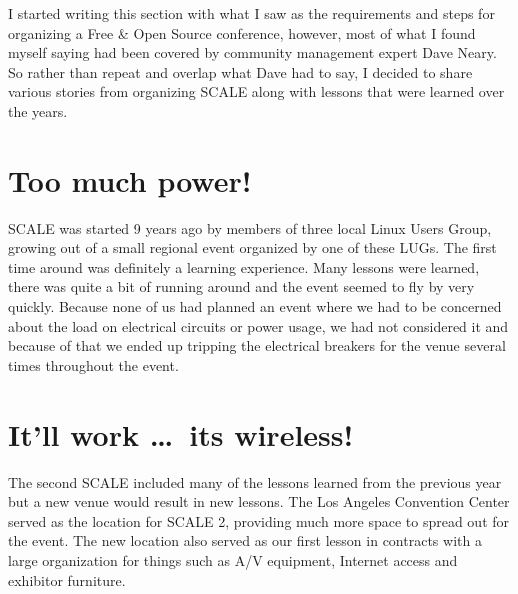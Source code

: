 

\noindent{}I started writing this section with what I saw as the requirements and steps for
organizing a Free \& Open Source conference, however, most of what I found myself saying had been covered by community management expert Dave Neary. So rather than repeat and overlap what Dave had to say, I decided to share various stories from organizing SCALE along with lessons that were learned over the years.

\section*{Too much power!}

SCALE was started 9 years ago by members of three local Linux Users Group,
growing out of a small regional event organized by one of these LUGs. The first
time around was definitely a learning experience. Many lessons were learned,
there was quite a bit of running around and the event seemed to fly by very
quickly. Because none of us had planned an event where we had to be
concerned about the load on electrical circuits or power usage, we had not
considered it and because of that we ended up tripping the electrical breakers
for the venue several times throughout the event.

\section*{It’ll work \dots\ its wireless!}

The second SCALE included many of the lessons learned from the previous year but
a new venue would result in new lessons. The Los Angeles Convention Center
served as the location for SCALE 2, providing much more space to spread out for
the event. The new location also served as our first lesson in contracts with a
large organization for things such as A/V equipment, Internet access and
exhibitor furniture.  

